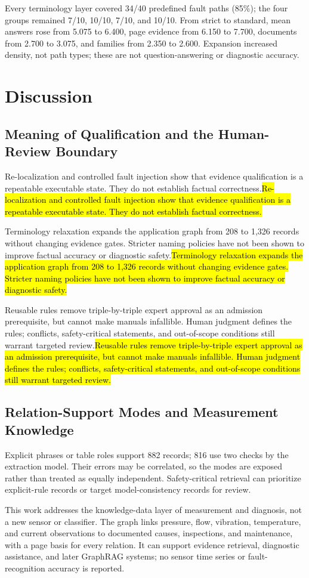 \documentclass[conference,a4paper]{IEEEtran}
\DeclareRobustCommand{\rev}[1]{\ifdefined\CleanVersion#1\else\hl{#1}\fi}
\begin{document}
Every terminology layer covered 34/40 predefined fault paths (85\%); the four groups remained 7/10, 10/10, 7/10, and 10/10. From strict to standard, mean answers rose from 5.075 to 6.400, page evidence from 6.150 to 7.700, documents from 2.700 to 3.075, and families from 2.350 to 2.600. Expansion increased density, not path types; these are not question-answering or diagnostic accuracy.

\section{Discussion}

\subsection{Meaning of Qualification and the Human-Review Boundary}

\rev{Re-localization and controlled fault injection show that evidence qualification is a repeatable executable state. They do not establish factual correctness.}

\rev{Terminology relaxation expands the application graph from 208 to 1,326 records without changing evidence gates. Stricter naming policies have not been shown to improve factual accuracy or diagnostic safety.}

\rev{Reusable rules remove triple-by-triple expert approval as an admission prerequisite, but cannot make manuals infallible. Human judgment defines the rules; conflicts, safety-critical statements, and out-of-scope conditions still warrant targeted review.}

\subsection{Relation-Support Modes and Measurement Knowledge}

Explicit phrases or table roles support 882 records; 816 use two checks by the extraction model. Their errors may be correlated, so the modes are exposed rather than treated as equally independent. Safety-critical retrieval can prioritize explicit-rule records or target model-consistency records for review.

This work addresses the knowledge-data layer of measurement and diagnosis, not a new sensor or classifier. The graph links pressure, flow, vibration, temperature, and current observations to documented causes, inspections, and maintenance, with a page basis for every relation. It can support evidence retrieval, diagnostic assistance, and later GraphRAG systems; no sensor time series or fault-recognition accuracy is reported.
\end{document}
